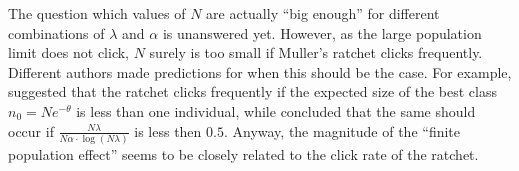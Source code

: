 The question which values of $N$ are actually ``big enough'' for different
combinations of $\lambda$ and $\alpha$ is unanswered yet. However, as the large
population limit does not click, $N$ surely is too small if Muller's ratchet
clicks frequently. Different authors made predictions for when this should be
the case. For example, \cite{haigh_accumulation_1978} suggested that the ratchet
clicks frequently if the expected size of the best class $n_0 = N e^{-\theta}$
is less than one individual, while \cite{etheridge_how_2008} concluded that the
same should occur if $\frac{N \lambda}{N \alpha \cdot \log(N\lambda)}$ is less then $0.5$.
Anyway, the magnitude of the ``finite population effect'' seems to be closely
related to the click rate of the ratchet.